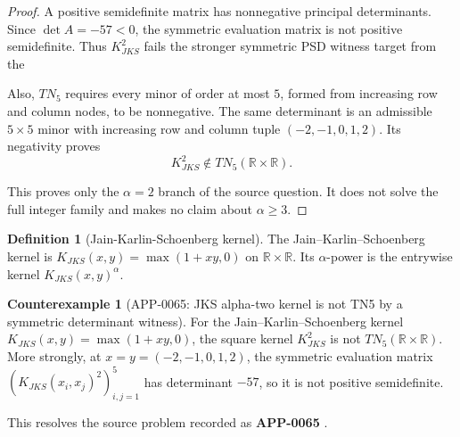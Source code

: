 \documentclass[11pt]{article}
\numberwithin{equation}{section}
\theoremstyle{definition}
\newtheorem{definition}{Definition}[section]
\newtheorem{counterexample}[theorem]{Counterexample}
\theoremstyle{remark}
\newcommand{\1}{\mathbf 1}
\begin{document}
\begin{proof}
A positive semidefinite matrix has nonnegative principal determinants. Since
\(\det A=-57<0\), the symmetric evaluation matrix is not positive semidefinite.
Thus \(K_{JKS}^2\) fails the stronger symmetric PSD witness target from the

Also, \(TN_5\) requires every minor of order at most \(5\), formed from
increasing row and column nodes, to be nonnegative. The same determinant is an
admissible \(5\times5\) minor with increasing row and column tuple
\((-2,-1,0,1,2)\). Its negativity proves
\[
K_{JKS}^2\notin TN_5(\mathbb R\times\mathbb R).
\]

This proves only the \(\alpha=2\) branch of the source question. It does not
solve the full integer family and makes no claim about \(\alpha\ge3\).
\end{proof}

\begin{definition}[Jain-Karlin-Schoenberg kernel]
\label{res:jks-kernel}
The Jain--Karlin--Schoenberg kernel is \(K_{JKS}(x,y)=\max(1+xy,0)\) on \(\mathbb R\times\mathbb R\). Its \(\alpha\)-power is the entrywise kernel \(K_{JKS}(x,y)^\alpha\).
\end{definition}

\begin{counterexample}[APP-0065: JKS alpha-two kernel is not TN5 by a symmetric determinant witness]
\label{res:jks-alpha2-nottn5-psdwitness}
For the Jain--Karlin--Schoenberg kernel \(K_{JKS}(x,y)=\max(1+xy,0)\), the square kernel \(K_{JKS}^2\) is not \(TN_5(\mathbb R\times\mathbb R)\). More strongly, at \(x=y=(-2,-1,0,1,2)\), the symmetric evaluation matrix \((K_{JKS}(x_i,x_j)^2)_{i,j=1}^5\) has determinant \(-57\), so it is not positive semidefinite.



This resolves the source problem recorded as \textbf{APP-0065} \cite{app-app-0065-source}.
\end{counterexample}
\end{document}
